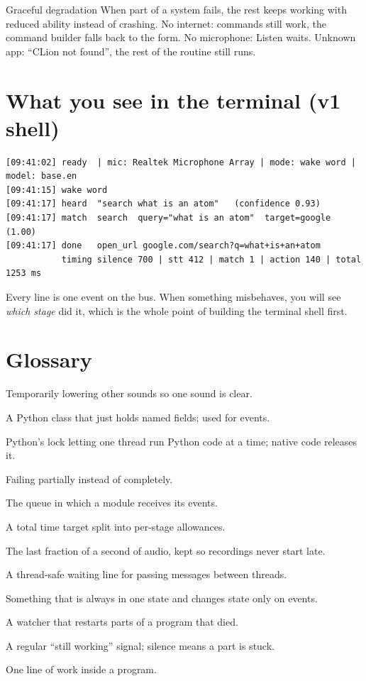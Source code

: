 \documentclass[11pt,a4paper]{article}
\begin{document}
\begin{concept}{Graceful degradation}
When part of a system fails, the rest keeps working with reduced ability instead of crashing.
No internet: commands still work, the command builder falls back to the form. No microphone:
Listen waits. Unknown app: ``CLion not found'', the rest of the routine still runs.
\end{concept}

\section{What you see in the terminal (v1 shell)}
\begin{lstlisting}
[09:41:02] ready  | mic: Realtek Microphone Array | mode: wake word | model: base.en
[09:41:15] wake word
[09:41:17] heard  "search what is an atom"   (confidence 0.93)
[09:41:17] match  search  query="what is an atom"  target=google  (1.00)
[09:41:17] done   open_url google.com/search?q=what+is+an+atom
           timing silence 700 | stt 412 | match 1 | action 140 | total 1253 ms
\end{lstlisting}
\noindent Every line is one event on the bus. When something misbehaves, you will see
\emph{which stage} did it, which is the whole point of building the terminal shell first.

\section{Glossary}
\begin{description}[style=nextline,leftmargin=1.2cm,itemsep=2pt]
  \item[Audio ducking] Temporarily lowering other sounds so one sound is clear.
  \item[Dataclass] A Python class that just holds named fields; used for events.
  \item[GIL] Python's lock letting one thread run Python code at a time; native code releases it.
  \item[Graceful degradation] Failing partially instead of completely.
  \item[Inbox] The queue in which a module receives its events.
  \item[Latency budget] A total time target split into per-stage allowances.
  \item[Pre-roll buffer] The last fraction of a second of audio, kept so recordings never start late.
  \item[Queue] A thread-safe waiting line for passing messages between threads.
  \item[State machine] Something that is always in one state and changes state only on events.
  \item[Supervisor] A watcher that restarts parts of a program that died.
  \item[Heartbeat] A regular ``still working'' signal; silence means a part is stuck.
  \item[Thread] One line of work inside a program.
\end{description}
\end{document}
